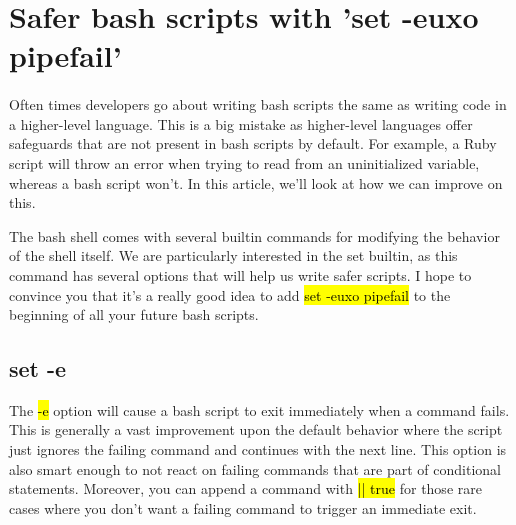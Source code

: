 \documentclass[a4paper]{article}
\begin{document}
\section{Safer bash scripts with 'set -euxo pipefail'}
\paragraph{}
Often times developers go about writing bash scripts the same as writing code in a higher-level language. This is a big mistake as higher-level languages offer safeguards that are not present in bash scripts by default. For example, a Ruby script will throw an error when trying to read from an uninitialized variable, whereas a bash script won’t. In this article, we’ll look at how we can improve on this.

The bash shell comes with several builtin commands for modifying the behavior of the shell itself. We are particularly interested in the set builtin, as this command has several options that will help us write safer scripts. I hope to convince you that it’s a really good idea to add \hl{set -euxo pipefail} to the beginning of all your future bash scripts.

\subsection{set -e}
The \hl{-e} option will cause a bash script to exit immediately when a command fails. 
This is generally a vast improvement upon the default behavior where the script just ignores the failing command and continues with the next line. 
This option is also smart enough to not react on failing commands that are part of conditional statements. 
Moreover, you can append a command with \hl{|| true} for those rare cases where you don’t want a failing command to trigger an immediate exit.
\end{document}
